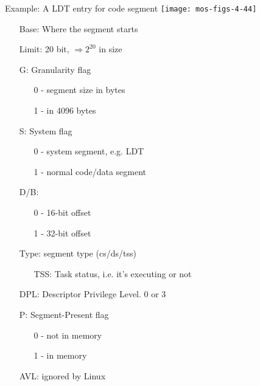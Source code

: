 \begin{frame}%
  \begin{block}{Example: A LDT entry for code segment}
    \texttt{[image: mos-figs-4-44]}
  \end{block}
    \small{\begin{multicols}{2}
      \begin{itemize}
      \item[Base:] Where the segment starts
      \item[Limit:] 20 bit, $\Rightarrow{}2^{20}$ in size
      \item[G:] Granularity flag
        \begin{itemize}
        \item[0] - segment size in bytes
        \item[1] - in 4096 bytes
        \end{itemize}
      \item[S:] System flag
        \begin{itemize}
        \item[0] - system segment, e.g. LDT
        \item[1] - normal code/data segment
        \end{itemize}\columnbreak
      \item[D/B:]
        \begin{itemize}
        \item[0] - 16-bit offset
        \item[1] - 32-bit offset
        \end{itemize}
      \item[Type:] segment type (cs/ds/tss)
        \begin{itemize}
        \item[TSS:] Task status, i.e. it's executing or not
        \end{itemize}
      \item[DPL:] Descriptor Privilege Level. 0 or 3
      \item[P:] Segment-Present flag
        \begin{itemize}
        \item[0] - not in memory
        \item[1] - in memory
        \end{itemize}
      \item[AVL:] ignored by Linux
      \end{itemize}
    \end{multicols}
}%
\end{frame}

